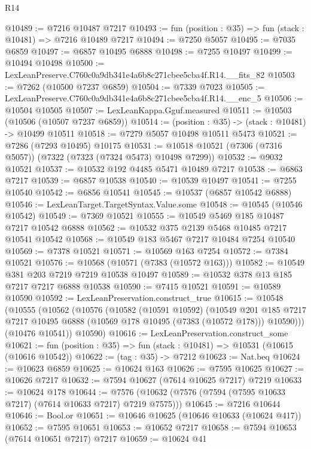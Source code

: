 \begin{lexlean}{R14}
\begin{coremodule}
@10489 := @7216 @10487 @7217
@10493 := fun (position : @35) => fun (stack : @10481) => @7216 @10489 @7217
@10494 := @7250 @5057
@10495 := @7035 @6859
@10497 := @6857 @10495 @6888
@10498 := @7255 @10497
@10499 := @10494 @10498
@10500 := LexLeanPreserve.C760c0a9db341e4a6b8c271cbee5cba4f.R14.__fits_82
@10503 := @7262 (@10500 @7237 @6859)
@10504 := @7339 @7023
@10505 := LexLeanPreserve.C760c0a9db341e4a6b8c271cbee5cba4f.R14.__enc_5
@10506 := @10504 @10505
@10507 := LexLeanKappa.Gguf.measured
@10511 := @10503 (@10506 (@10507 @7237 @6859))
@10514 := (position : @35) -> (stack : @10481) -> @10499 @10511
@10518 := @7279 @5057 @10498 @10511 @5473
@10521 := @7286 (@7293 @10495) @10175
@10531 := @10518 @10521 (@7306 (@7316 @5057)) (@7322 (@7323 (@7324 @5473) @10498 @7299))
@10532 := @9032 @10521
@10537 := @10532 @192 @4485 @5471 @10489 @7217
@10538 := @6863 @7217
@10539 := @6857 @10538
@10540 := @10539 @10497
@10541 := @7255 @10540
@10542 := @6856 @10541
@10545 := @10537 (@6857 @10542 @6888)
@10546 := LexLeanTarget.TargetSyntax.Value.some
@10548 := @10545 (@10546 @10542)
@10549 := @7369 @10521
@10555 := @10549 @5469 @185 @10487 @7217 @10542 @6888
@10562 := @10532 @375 @2139 @5468 @10485 @7217 @10541 @10542
@10568 := @10549 @183 @5467 @7217 @10484 @7254 @10540
@10569 := @7378 @10521
@10571 := @10569 @163 @7254
@10572 := @7384 @10521
@10576 := @10568 (@10571 (@7383 (@10572 @163)))
@10582 := @10549 @381 @203 @7219 @7219 @10538 @10497
@10589 := @10532 @378 @13 @185 @7217 @7217 @6888 @10538
@10590 := @7415 @10521
@10591 := @10589 @10590
@10592 := LexLeanPreservation.construct_true
@10615 := @10548
    (@10555
      (@10562
        (@10576
          (@10582
            (@10591 @10592)
            (@10549
              @201
              @185
              @7217
              @7217
              @10495
              @6888
              (@10569 @178 @10495 (@7383 (@10572 @178)))
              @10590)))
        (@10476 @10541))
      @10590)
@10616 := LexLeanPreservation.construct_some
@10621 := fun (position : @35) => fun (stack : @10481) => @10531 (@10615 (@10616 @10542))
@10622 := (tag : @35) -> @7212
@10623 := Nat.beq
@10624 := @10623 @6859
@10625 := @10624 @163
@10626 := @7595 @10625
@10627 := @10626 @7217
@10632 := @7594 @10627 (@7614 @10625 @7217) @7219
@10633 := @10624 @178
@10644 := @7576 (@10632 (@7576 (@7594 (@7595 @10633 @7217) (@7614 @10633 @7217) @7219 @7575)))
@10645 := @7216 @10644
@10646 := Bool.or
@10651 := @10646 @10625 (@10646 @10633 (@10624 @417))
@10652 := @7595 @10651
@10653 := @10652 @7217
@10658 := @7594 @10653 (@7614 @10651 @7217) @7217
@10659 := @10624 @41

\end{coremodule}
\end{lexlean}
